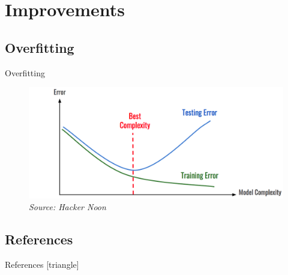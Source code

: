 \documentclass[xcolor=dvipsnames, fontsize=11pt, %
pagesize, %
parskip=half-, t]{beamer}
\begin{document}
\section{Improvements}
\subsection{Overfitting}
\begin{frame}{Overfitting}
\begin{figure}[H]
\includegraphics[scale=0.33]{overfitting.png}
\caption{\textit{Source: Hacker Noon}}
\end{figure}
\end{frame}
\subsection{References}
\begin{frame}[c]{References}
[triangle]

\href{http://neuralnetworksanddeeplearning.com/chap1.html}{} \smallskip

\href{https://ljvmiranda921.github.io/notebook/2017/08/13/softmax-and-the-negative-log-likelihood/}{} \smallskip

\href{https://towardsdatascience.com/a-beginners-guide-to-neural-networks-part-two-bd503514c71a}{} \medskip

\href{https://www.deeplearningbook.org/}{} \medskip


\href{http://scs.ryerson.ca/~aharley/vis/fc/}{} \smallskip

\href{https://jed-ai.github.io/py1_gd_animation/}{} 

\href{https://www.tensorflow.org/tutorials}{} \medskip


\end{frame}
\end{document}
